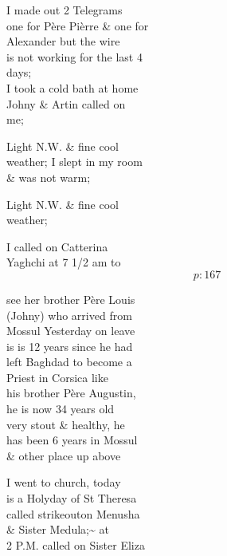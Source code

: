 \documentclass{report}
\begin{document}
	\par{
 	I made out 2 Telegrams\ \\one for Père Pièrre \& one for\ \\Alexander but the wire\ \\is not working for the last 4\ \\days;\ \\I took a cold bath at home\ \\Johny \& Artin called on\ \\me;\ \\
	}

	\par{
 	Light N.W. \& fine cool\ \\weather; I slept in my room\ \\\& was not warm;\ \\
	}

	\par{
 	Light N.W. \& fine cool\ \\weather;\ \\
	}

	\par{
 	I called on Catterina\ \\Yaghchi at 7 1/2 am to\ \\
  \[p: 167 \]

	}




	\par{
 	see her brother Père Louis\ \\(Johny) who arrived from\ \\Mossul Yesterday on leave\ \\is is 12 years since he had\ \\left Baghdad to become a\ \\Priest in Corsica like\ \\his brother Père Augustin,\ \\he is now 34 years old\ \\very stout \& healthy, he\ \\has been 6 years in Mossul\ \\\& other place up above\ \\
	}

	\par{
 	I went to church, today\ \\is a Holyday of St Theresa\ \\called \lbrack strikeout\rbrack on Menusha\ \\\& Sister Medula;\~{} at\ \\2 P.M. called on Sister Eliza\ \\
	}
\end{document}
